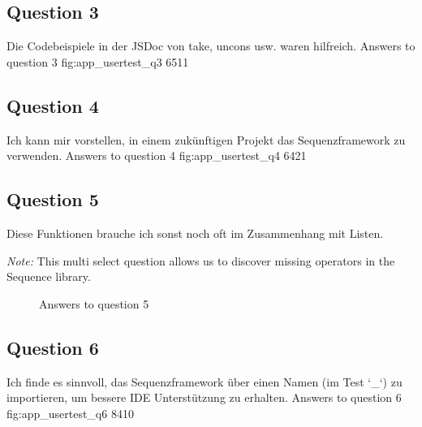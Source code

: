 \subsection*{Question 3}
\label{sub:ut_q3}
Die Codebeispiele in der JSDoc von take, uncons usw. waren hilfreich. 
\likertbarchart
  {Answers to question 3}
  {fig:app_usertest_q3}
  {6}{5}{1}{1}

\subsection*{Question 4}
\label{sub:ut_q4}
Ich kann mir vorstellen, in einem zukünftigen Projekt das Sequenzframework zu verwenden.
\likertbarchart
  {Answers to question 4}
  {fig:app_usertest_q4}
  {6}{4}{2}{1}

\subsection*{Question 5}
\label{sub:ut_q5}
Diese Funktionen brauche ich sonst noch oft im Zusammenhang mit Listen.

\textit{Note:} This multi select question allows us to discover missing
operators in the Sequence library.
  \begin{figure}[H]
    \centering
    \caption{Answers to question 5}
    \label{fig:app_usertest_q5}
  \end{figure}
\subsection*{Question 6}
\label{sub:ut_q6}
Ich finde es sinnvoll, das Sequenzframework über einen Namen (im Test `\_`) zu importieren, um bessere IDE Unterstützung zu erhalten.
\likertbarchart
  {Answers to question 6}
  {fig:app_usertest_q6}
  {8}{4}{1}{0}

